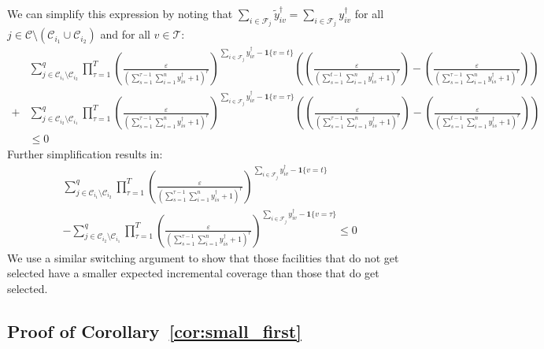 \documentclass[nonblindrev]{informs3noheader}
\def\calC{\mathcal{C}}
\def\calF{\mathcal{F}}
\def\calT{\mathcal{T}}
\begin{document}
We can simplify this expression by noting that $\sum_{i \in \calF_j} \widetilde{y}^\dagger_{iv}=\sum_{i \in \calF_j} y^\dagger_{iv}$ for all $j\in\calC\setminus(\calC_{i_1}\cup\calC_{i_2})$ and for all $v\in\calT$:
\begin{align*}
    &\sum_{j \in \calC_{i_1} \setminus \calC_{i_2}}^q \prod_{\tau=1}^T \left(\frac{\varepsilon}{\left(\sum_{s=1}^{\tau-1} \sum_{i=1}^n y^\dagger_{is} +1\right)^r}\right)^{\sum_{i \in \calF_j} y^\dagger_{iv}-\mathbf{1}\{v=t\}} \left(\left(\frac{\varepsilon}{\left(\sum_{s=1}^{t-1} \sum_{i=1}^n y^\dagger_{is} +1\right)^r}\right)-\left(\frac{\varepsilon}{\left(\sum_{s=1}^{\tau-1} \sum_{i=1}^n y^\dagger_{is} +1\right)^r}\right)\right)
    \\+&\sum_{j \in \calC_{i_2} \setminus \calC_{i_1}}^q \prod_{\tau=1}^T \left(\frac{\varepsilon}{\left(\sum_{s=1}^{\tau-1} \sum_{i=1}^n y^\dagger_{is} +1\right)^r}\right)^{\sum_{i \in \calF_j} y^\dagger_{iv}-\mathbf{1}\{v=\tau\}} \left(\left(\frac{\varepsilon}{\left(\sum_{s=1}^{\tau-1} \sum_{i=1}^n y^\dagger_{is} +1\right)^r}\right)-\left(\frac{\varepsilon}{\left(\sum_{s=1}^{t-1} \sum_{i=1}^n y^\dagger_{is} +1\right)^r}\right)\right)\\
    &\leq 0
\end{align*}
Further simplification results in:
\begin{align*}
    &\sum_{j \in \calC_{i_1} \setminus \calC_{i_2}}^q \prod_{\tau=1}^T \left(\frac{\varepsilon}{\left(\sum_{s=1}^{\tau-1} \sum_{i=1}^n y^\dagger_{is} +1\right)^r}\right)^{\sum_{i \in \calF_j} y^\dagger_{iv}-\mathbf{1}\{v=t\}}\\
    &-\sum_{j \in \calC_{i_2} \setminus \calC_{i_1}}^q \prod_{\tau=1}^T \left(\frac{\varepsilon}{\left(\sum_{s=1}^{\tau-1} \sum_{i=1}^n y^\dagger_{is} +1\right)^r}\right)^{\sum_{i \in \calF_j} y^\dagger_{iv}-\mathbf{1}\{v=\tau\}}
    \leq 0
\end{align*}
We use a similar switching argument to show that those facilities that do not get selected have a smaller expected incremental coverage than those that do get selected.\hfill\Halmos

\subsection{Proof of Corollary~\ref{cor:small_first}}
\end{document}

